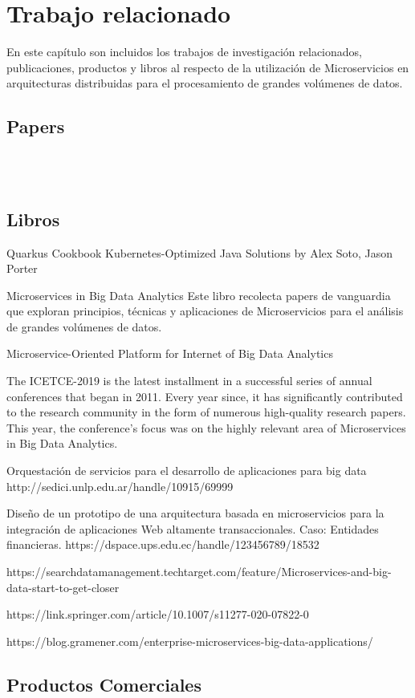 \chapter{Trabajo relacionado}

En este capítulo son incluidos  los trabajos de investigación relacionados, publicaciones, productos y libros al respecto de la utilización de Microservicios en arquitecturas distribuidas para el procesamiento de grandes volúmenes de datos.


\section{Papers}


\\

\\
 

\section{Libros}

Quarkus Cookbook Kubernetes-Optimized Java Solutions by Alex Soto, Jason Porter

\par


Microservices in Big Data Analytics
\cite{MicroservicesInBigDataAnalytics}
Este libro recolecta papers de vanguardia que exploran principios, técnicas y aplicaciones de Microservicios para el análisis de grandes volúmenes de datos.
\par

Microservice-Oriented Platform for Internet of Big Data Analytics
\cite{3084568720190306}

\par




The ICETCE-2019 is the latest installment in a successful series of annual conferences that began in 2011. Every year since, it has significantly contributed to the research community in the form of numerous high-quality research papers. This year, the conference’s focus was on the highly relevant area of Microservices in Big Data Analytics.


Orquestación de servicios para el desarrollo de aplicaciones para big data
http://sedici.unlp.edu.ar/handle/10915/69999


Diseño de un prototipo de una arquitectura basada en microservicios para la integración de aplicaciones Web altamente transaccionales. Caso: Entidades financieras.
https://dspace.ups.edu.ec/handle/123456789/18532

https://searchdatamanagement.techtarget.com/feature/Microservices-and-big-data-start-to-get-closer

https://link.springer.com/article/10.1007/s11277-020-07822-0

https://blog.gramener.com/enterprise-microservices-big-data-applications/

\section{Productos Comerciales}